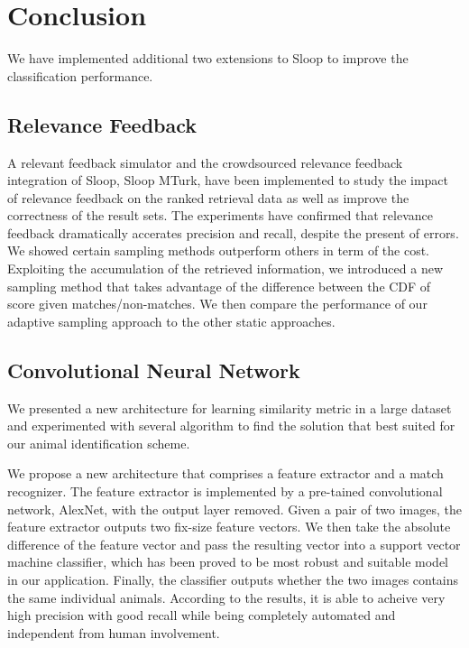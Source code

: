 \chapter{Conclusion}

We have implemented additional two extensions to Sloop to improve the classification performance.

\section{Relevance Feedback}
A relevant feedback simulator and the crowdsourced relevance feedback integration of Sloop, Sloop MTurk, have been implemented to study the impact of relevance feedback on the ranked retrieval data as well as improve the correctness of the result sets. The experiments have confirmed that relevance feedback dramatically accerates precision and recall, despite the present of errors. We showed certain sampling methods outperform others in term of the cost. Exploiting the accumulation of the retrieved information, we introduced a new sampling method that takes advantage of the difference between the CDF of score given matches/non-matches. We then compare the performance of our adaptive sampling approach to the other static  approaches.

\section{Convolutional Neural Network}

We presented a new architecture for learning similarity metric in a large dataset and experimented with several algorithm to find the solution that best suited for our animal identification scheme. 

We propose a new architecture that comprises a feature extractor and a match recognizer. The feature extractor is implemented by a pre-tained convolutional network, AlexNet, with the output layer removed. Given a pair of two images, the feature extractor outputs two fix-size feature vectors. We then take the absolute difference of the feature vector and pass the resulting vector into a support vector machine classifier, which has been proved to be most robust and suitable model in our application. Finally, the classifier outputs whether the two images contains the same individual animals. According to the results, it is able to acheive very high precision with good recall while being completely automated and independent from human involvement. 

